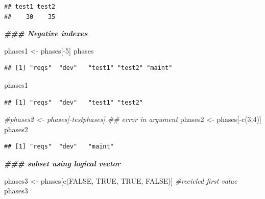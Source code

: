 \documentclass[
]{book}
\newenvironment{Shaded}{\begin{snugshade}}{\end{snugshade}}
\newcommand{\CommentTok}[1]{\textcolor[rgb]{0.56,0.35,0.01}{\textit{#1}}}
\newcommand{\ConstantTok}[1]{\textcolor[rgb]{0.00,0.00,0.00}{#1}}
\newcommand{\DecValTok}[1]{\textcolor[rgb]{0.00,0.00,0.81}{#1}}
\newcommand{\DocumentationTok}[1]{\textcolor[rgb]{0.56,0.35,0.01}{\textbf{\textit{#1}}}}
\newcommand{\FunctionTok}[1]{\textcolor[rgb]{0.00,0.00,0.00}{#1}}
\newcommand{\NormalTok}[1]{#1}
\newcommand{\OtherTok}[1]{\textcolor[rgb]{0.56,0.35,0.01}{#1}}
\newcommand{\SpecialCharTok}[1]{\textcolor[rgb]{0.00,0.00,0.00}{#1}}
\begin{document}
\begin{verbatim}
## test1 test2 
##    30    35
\end{verbatim}

\begin{Shaded}
\begin{Highlighting}[]
\DocumentationTok{\#\#\# Negative indexes}

\NormalTok{phases1 }\OtherTok{\textless{}{-}}\NormalTok{ phases[}\SpecialCharTok{{-}}\DecValTok{5}\NormalTok{]}
\NormalTok{phases}
\end{Highlighting}
\end{Shaded}

\begin{verbatim}
## [1] "reqs"  "dev"   "test1" "test2" "maint"
\end{verbatim}

\begin{Shaded}
\begin{Highlighting}[]
\NormalTok{phases1}
\end{Highlighting}
\end{Shaded}

\begin{verbatim}
## [1] "reqs"  "dev"   "test1" "test2"
\end{verbatim}

\begin{Shaded}
\begin{Highlighting}[]
\CommentTok{\#phases2 \textless{}{-} phases[{-}testphases] \#\# error in argument}
\NormalTok{phases2 }\OtherTok{\textless{}{-}}\NormalTok{ phases[}\SpecialCharTok{{-}}\FunctionTok{c}\NormalTok{(}\DecValTok{3}\NormalTok{,}\DecValTok{4}\NormalTok{)]}
\NormalTok{phases2}
\end{Highlighting}
\end{Shaded}

\begin{verbatim}
## [1] "reqs"  "dev"   "maint"
\end{verbatim}

\begin{Shaded}
\begin{Highlighting}[]
\DocumentationTok{\#\#\# subset using logical vector}

\NormalTok{phases3 }\OtherTok{\textless{}{-}}\NormalTok{ phases[}\FunctionTok{c}\NormalTok{(}\ConstantTok{FALSE}\NormalTok{, }\ConstantTok{TRUE}\NormalTok{, }\ConstantTok{TRUE}\NormalTok{, }\ConstantTok{FALSE}\NormalTok{)] }\CommentTok{\#recicled first value}
\NormalTok{phases3}
\end{Highlighting}
\end{Shaded}
\end{document}
